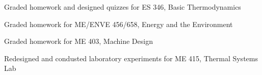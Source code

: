 \begin{job}

  \item Graded homework and designed quizzes for ES 346, Basic Thermodynamics
  \item Graded homework for ME/ENVE 456/658, Energy and the Environment
  \item Graded homework for ME 403, Machine Design
  \item Redesigned and condusted laboratory experiments for ME 415, Thermal
    Systems Lab
\end{job}

